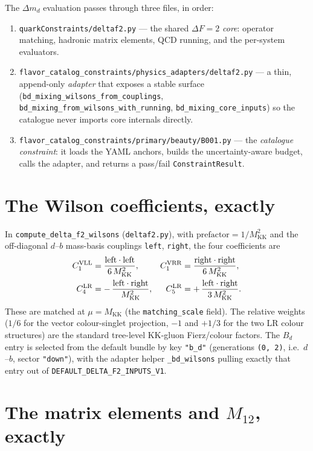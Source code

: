 \documentclass[11pt]{article}
\newcommand{\MKK}{M_{\mathrm{KK}}}
\newcommand{\dmd}{\Delta m_d}
\newcommand{\code}[1]{\texttt{#1}}
\theoremstyle{definition}
\begin{document}
The $\dmd$ evaluation passes through three files, in order:
\begin{enumerate}[leftmargin=1.6em]
\item \code{quarkConstraints/deltaf2.py} --- the shared $\Delta F=2$ \emph{core}:
operator matching, hadronic matrix elements, QCD running, and the per-system
evaluators.
\item \code{flavor\_catalog\_constraints/physics\_adapters/deltaf2.py} --- a thin,
append-only \emph{adapter} that exposes a stable surface
(\code{bd\_mixing\_wilsons\_from\_couplings},
\code{bd\_mixing\_from\_wilsons\_with\_running},
\code{bd\_mixing\_core\_inputs}) so the catalogue never imports core internals
directly.
\item \code{flavor\_catalog\_constraints/primary/beauty/B001.py} --- the
\emph{catalogue constraint}: it loads the YAML anchors, builds the
uncertainty-aware budget, calls the adapter, and returns a pass/fail
\code{ConstraintResult}.
\end{enumerate}

\section{The Wilson coefficients, exactly}
\label{sec:codewilsons}

In \code{compute\_delta\_f2\_wilsons} (\code{deltaf2.py}), with
$\text{prefactor}=1/\MKK^2$ and the off-diagonal $d$--$b$ mass-basis couplings
\code{left}, \code{right}, the four coefficients are
\begin{align}
C_1^{\rm VLL} &= \frac{\text{left}\cdot\text{left}}{6\,\MKK^2}, &
C_1^{\rm VRR} &= \frac{\text{right}\cdot\text{right}}{6\,\MKK^2},
\label{eq:codeVLL}\\
C_4^{\rm LR} &= -\,\frac{\text{left}\cdot\text{right}}{\MKK^2}, &
C_5^{\rm LR} &= +\,\frac{\text{left}\cdot\text{right}}{3\,\MKK^2}.
\label{eq:codeLR}
\end{align}
These are matched at $\mu=\MKK$ (the \code{matching\_scale} field). The relative
weights ($1/6$ for the vector colour-singlet projection, $-1$ and $+1/3$ for the
two LR colour structures) are the standard tree-level KK-gluon Fierz/colour
factors. The $B_d$ entry is selected from the default bundle by key \code{"b\_d"}
(generations \code{(0, 2)}, i.e.\ $d$--$b$, sector \code{"down"}), with the
adapter helper \code{\_bd\_wilsons} pulling exactly that entry out of
\code{DEFAULT\_DELTA\_F2\_INPUTS\_V1}.

\section{The matrix elements and $M_{12}$, exactly}
\label{sec:codeME}
\end{document}
